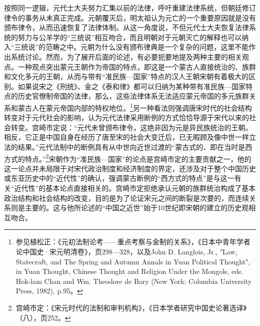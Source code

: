 \documentclass[a4paper, 12pt, openright]{ctexbook}
\begin{document}
按照同一逻辑，元代士大夫努力汇集以前的法律，呼吁重建法律系统，但朝廷修订律令的事务从未真正完成。元朝覆灭后，明太祖认为元亡的一个重要原因就是没有颁布律令，从而迅速恢复了法律体制。从这一角度说，不但元代士大夫恢复法律系统的努力与公羊学的“三统说”相互吻合，而且明朝对于元朝灭亡的解释也可以纳入“三统说”的范畴之中。元朝为什么没有颁布律典是一个复杂的问题，这里不能作出系统讨论。然而，为了展开后面的论述，有必要扼要地提及两种主要的相关观点。一种观点突出蒙元王朝作为帝国的特点，即这是一个蒙古人直接统治的、族群和文化多元的王朝，从而与带有“准民族—国家”特点的汉人王朝宋朝有着极大的区别。如果说宋之《刑统》、金之《泰和律》都可以归纳为某种带有准民族—国家特点的历史官僚制帝国的法律，那么，这些法律体系无法适应蒙元帝国的多元族群关系和蒙古人在蒙元帝国内部的特权地位。\footnote{参见植松正：《元初法制论考——重点考察与金制的关系》，《日本中青年学者论中国史·宋元明清卷》，页298—328，以及John D. Langlois, Jr., "Law, Statecraft, and The Spring and Autumn Annals in Yuan Political Thought", in Yuan Thought, Chinese Thought and Religion Under the Mongols, eds. Hok-lam Chan and Wm. Theodore de Bary (New York: Columbia University Press, 1982), p.95。}另一种看法则强调唐宋时代的社会结构转变对于元代社会的影响，认为元代法律采用断例的方式恰恰导源于宋代以来的社会转变。宫崎市定说：“元代未曾颁布律令，这绝非因为元是异民族统治的王朝。相反，它正是中国自身在经历了唐至宋的社会大变迁后，已无暇顾及像中世一样立法的结果。”元代法制中的断例具有从中世向近世过渡的“蒙古式的、即在当时是西方式的特点。”\footnote{宫崎市定：《宋元时代的法制和审判机构》，《日本学者研究中国史论著选译》（八），页252。}宋朝作为“准民族—国家”的论点是宫崎市定的主要贡献之一，他的这一论点并未局限于对宋代政治制度和经济制度的界定，还涉及对于整个中国历史或东亚历史中的“近代性”的确认，强调蒙古断例的“西方式的特点”是与这一有关“近代性”的基本论点直接相关的。宫崎市定拒绝承认元朝的族群统治构成了基本政治结构和社会结构的改变，目的是为了论证宋元之间的断裂是次要的，而连续关系则是主要的。这与他所论述的“中国之近世”始于10世纪即宋朝的建立的历史观相互吻合。
\end{document}
